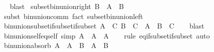 \begin{isabellebody}
\ %
\endisadelimproof
%
\isatagproof
{}\isamarkupfalse%
\ blast%
\endisatagproof
{\isafoldproof}%
%
\isadelimproof
%
\endisadelimproof
\isanewline
\isanewline
{}\isamarkupfalse%
\ subset{\isacharunderscore}{\kern0pt}bin{\isacharunderscore}{\kern0pt}union{\isacharunderscore}{\kern0pt}right{\isacharcolon}{\kern0pt}\ {\isachardoublequoteopen}B\ {\isasymsubseteq}\ A\ {\isasymunion}\ B{\isachardoublequoteclose}\isanewline
%
\isadelimproof
\ \ %
\endisadelimproof
%
\isatagproof
{}\isamarkupfalse%
\ {\isacharparenleft}{\kern0pt}subst\ bin{\isacharunderscore}{\kern0pt}union{\isacharunderscore}{\kern0pt}comm{\isacharparenright}{\kern0pt}\ {\isacharparenleft}{\kern0pt}fact\ subset{\isacharunderscore}{\kern0pt}bin{\isacharunderscore}{\kern0pt}union{\isacharunderscore}{\kern0pt}left{\isacharparenright}{\kern0pt}%
\endisatagproof
{\isafoldproof}%
%
\isadelimproof
\isanewline
%
\endisadelimproof
\isanewline
{}\isamarkupfalse%
\ bin{\isacharunderscore}{\kern0pt}union{\isacharunderscore}{\kern0pt}subset{\isacharunderscore}{\kern0pt}if{\isacharunderscore}{\kern0pt}subset{\isacharunderscore}{\kern0pt}if{\isacharunderscore}{\kern0pt}subset{\isacharcolon}{\kern0pt}\ {\isachardoublequoteopen}{\isasymlbrakk}A\ {\isasymsubseteq}\ C{\isacharsemicolon}{\kern0pt}\ B\ {\isasymsubseteq}\ C{\isasymrbrakk}\ {\isasymLongrightarrow}\ A\ {\isasymunion}\ B\ {\isasymsubseteq}\ C{\isachardoublequoteclose}\isanewline
%
\isadelimproof
\ \ %
\endisadelimproof
%
\isatagproof
{}\isamarkupfalse%
\ blast%
\endisatagproof
{\isafoldproof}%
%
\isadelimproof
\isanewline
%
\endisadelimproof
\isanewline
{}\isamarkupfalse%
\ bin{\isacharunderscore}{\kern0pt}union{\isacharunderscore}{\kern0pt}self{\isacharunderscore}{\kern0pt}eq{\isacharunderscore}{\kern0pt}self\ {\isacharbrackleft}{\kern0pt}simp{\isacharbrackright}{\kern0pt}{\isacharcolon}{\kern0pt}\ {\isachardoublequoteopen}A\ {\isasymunion}\ A\ {\isacharequal}{\kern0pt}\ A{\isachardoublequoteclose}\isanewline
%
\isadelimproof
\ \ %
\endisadelimproof
%
\isatagproof
{}\isamarkupfalse%
\ {\isacharparenleft}{\kern0pt}rule\ eq{\isacharunderscore}{\kern0pt}if{\isacharunderscore}{\kern0pt}subset{\isacharunderscore}{\kern0pt}if{\isacharunderscore}{\kern0pt}subset{\isacharparenright}{\kern0pt}\ auto%
\endisatagproof
{\isafoldproof}%
%
\isadelimproof
\isanewline
%
\endisadelimproof
\isanewline
{}\isamarkupfalse%
\ bin{\isacharunderscore}{\kern0pt}union{\isacharunderscore}{\kern0pt}absorb{\isacharcolon}{\kern0pt}\ {\isachardoublequoteopen}A\ {\isasymunion}\ {\isacharparenleft}{\kern0pt}A\ {\isasymunion}\ B{\isacharparenright}{\kern0pt}\ {\isacharequal}{\kern0pt}\ A\ {\isasymunion}\ B{\isachardoublequoteclose}\isanewline

\end{isabellebody}
